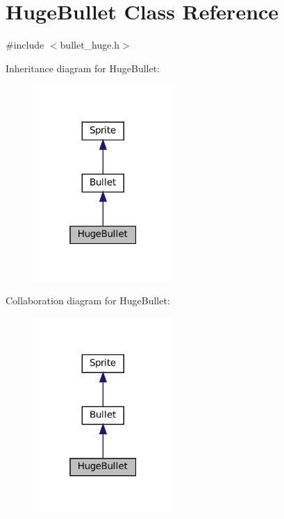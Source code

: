 \hypertarget{classHugeBullet}{}\section{Huge\+Bullet Class Reference}
\label{classHugeBullet}


{\ttfamily \#include $<$bullet\+\_\+huge.\+h$>$}



Inheritance diagram for Huge\+Bullet\+:
\nopagebreak
\begin{figure}[H]
\begin{center}
\leavevmode
\includegraphics[width=151pt]{classHugeBullet__inherit__graph}
\end{center}
\end{figure}


Collaboration diagram for Huge\+Bullet\+:
\nopagebreak
\begin{figure}[H]
\begin{center}
\leavevmode
\includegraphics[width=151pt]{classHugeBullet__coll__graph}
\end{center}
\end{figure}
